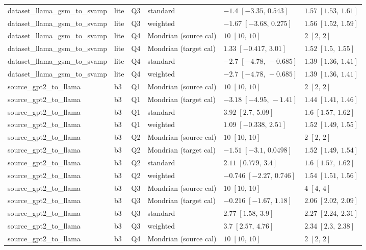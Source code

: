 \begin{longtable}{@{}p{}p{}p{}p{}p{}p{}@{}}
dataset\_llama\_gsm\_to\_svamp & lite & Q3 & standard & $-1.4\;[-3.35,\,0.543]$ & $1.57\;[1.53,\,1.61]$ \\
dataset\_llama\_gsm\_to\_svamp & lite & Q3 & weighted & $-1.67\;[-3.68,\,0.275]$ & $1.56\;[1.52,\,1.59]$ \\
dataset\_llama\_gsm\_to\_svamp & lite & Q4 & Mondrian (source cal) & $10\;[10,\,10]$ & $2\;[2,\,2]$ \\
dataset\_llama\_gsm\_to\_svamp & lite & Q4 & Mondrian (target cal) & $1.33\;[-0.417,\,3.01]$ & $1.52\;[1.5,\,1.55]$ \\
dataset\_llama\_gsm\_to\_svamp & lite & Q4 & standard & $-2.7\;[-4.78,\,-0.685]$ & $1.39\;[1.36,\,1.41]$ \\
dataset\_llama\_gsm\_to\_svamp & lite & Q4 & weighted & $-2.7\;[-4.78,\,-0.685]$ & $1.39\;[1.36,\,1.41]$ \\
source\_gpt2\_to\_llama & b3 & Q1 & Mondrian (source cal) & $10\;[10,\,10]$ & $2\;[2,\,2]$ \\
source\_gpt2\_to\_llama & b3 & Q1 & Mondrian (target cal) & $-3.18\;[-4.95,\,-1.41]$ & $1.44\;[1.41,\,1.46]$ \\
source\_gpt2\_to\_llama & b3 & Q1 & standard & $3.92\;[2.7,\,5.09]$ & $1.6\;[1.57,\,1.62]$ \\
source\_gpt2\_to\_llama & b3 & Q1 & weighted & $1.09\;[-0.338,\,2.51]$ & $1.52\;[1.49,\,1.55]$ \\
source\_gpt2\_to\_llama & b3 & Q2 & Mondrian (source cal) & $10\;[10,\,10]$ & $2\;[2,\,2]$ \\
source\_gpt2\_to\_llama & b3 & Q2 & Mondrian (target cal) & $-1.51\;[-3.1,\,0.0498]$ & $1.52\;[1.49,\,1.54]$ \\
source\_gpt2\_to\_llama & b3 & Q2 & standard & $2.11\;[0.779,\,3.4]$ & $1.6\;[1.57,\,1.62]$ \\
source\_gpt2\_to\_llama & b3 & Q2 & weighted & $-0.746\;[-2.27,\,0.746]$ & $1.54\;[1.51,\,1.56]$ \\
source\_gpt2\_to\_llama & b3 & Q3 & Mondrian (source cal) & $10\;[10,\,10]$ & $4\;[4,\,4]$ \\
source\_gpt2\_to\_llama & b3 & Q3 & Mondrian (target cal) & $-0.216\;[-1.67,\,1.18]$ & $2.06\;[2.02,\,2.09]$ \\
source\_gpt2\_to\_llama & b3 & Q3 & standard & $2.77\;[1.58,\,3.9]$ & $2.27\;[2.24,\,2.31]$ \\
source\_gpt2\_to\_llama & b3 & Q3 & weighted & $3.7\;[2.57,\,4.76]$ & $2.34\;[2.3,\,2.38]$ \\
source\_gpt2\_to\_llama & b3 & Q4 & Mondrian (source cal) & $10\;[10,\,10]$ & $2\;[2,\,2]$ \\

\end{longtable}
